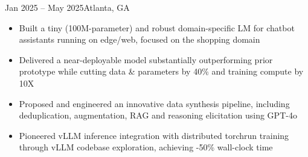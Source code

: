     {}
    {Jan 2025 -- May 2025}{Atlanta, GA}{}
\begin{itemize}
    \item Built a tiny (100M-parameter) and robust domain-specific LM for chatbot assistants running on edge/web, 
    focused on the shopping domain

    \item Delivered a near-deployable model substantially
    outperforming prior prototype
    while cutting data \& parameters by 40\% and training compute by 10X

    \item Proposed and engineered an innovative data synthesis pipeline,
    including deduplication, 
    augmentation,
    RAG and reasoning elicitation
    using GPT-4o


    \item Pioneered vLLM inference integration with distributed torchrun training
    through vLLM codebase exploration,
    achieving -50\% wall-clock time


\end{itemize}
